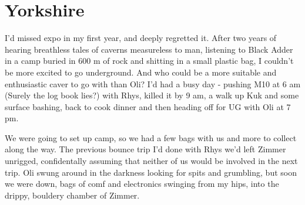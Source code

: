 \section{Yorkshire}
\begin{marginfigure}
\end{marginfigure}

I’d missed expo in my first year, and deeply regretted it. After two years of hearing breathless tales of caverns measureless to man, listening to Black Adder in a camp buried in 600 m of rock and shitting in a small plastic bag, I couldn’t be more excited to go underground. And who could be a more suitable and enthusiastic caver to go with than Oli? I’d had a busy day - pushing M10 at 6 am (Surely the log book lies?) with Rhys, killed it by 9 am, a walk up Kuk and some surface bashing, back to cook dinner and then heading off for UG with Oli at 7 pm.

We were going to set up camp, so we had a few bags with us and more to collect along the way. The previous bounce trip I’d done with Rhys we’d left Zimmer unrigged, confidentally assuming that neither of us would be involved in the next trip. Oli swung around in the darkness looking for spits and grumbling, but soon we were down, bags of comf and electronics swinging from my hips, into the drippy, bouldery chamber of Zimmer.

